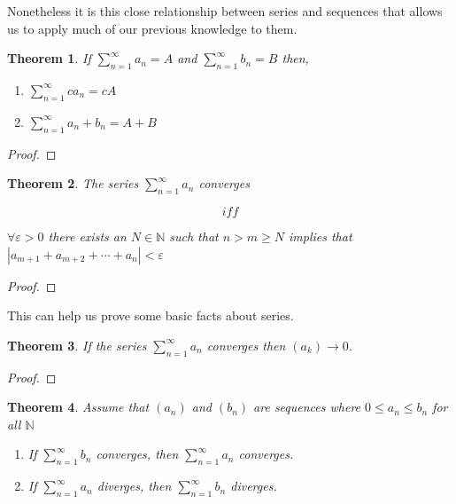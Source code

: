 \documentclass{tufte-book}
\newtheorem{theorem}{Theorem}[chapter]
\theoremstyle{definition}
\numberwithin{section}{chapter}
\begin{document}
		Nonetheless it is this close relationship between series and sequences that allows us to apply much of our previous knowledge to them.
		
		
		\begin{theorem}
		If $\sum_{n=1}^{\infty} a_n = A$ and $\sum_{n=1}^{\infty} b_n = B$ then,
			\begin{enumerate}[(1)]
				\item $\sum_{n=1}^{\infty} c a_n = cA$
				\item $\sum_{n=1}^{\infty} a_n + b_n = A + B$
			\end{enumerate}
		\end{theorem}
		
		\begin{proof}
		\end{proof}
		
		\begin{theorem} 
		The series $\sum_{n=1}^{\infty} a_n$ converges 
		
		$$iff$$
		
		
		 $\forall \varepsilon > 0$ there exists an $N \in \mathbb{N}$ such that $n>m\geq N$ implies that $|a_{m+1} + a_{m+2} + \cdots + a_n| < \varepsilon$
		\end{theorem}
		
		
	\begin{proof}  \end{proof}
	
	This can help us prove some basic facts about series.
	
	
	\begin{theorem} If the series $\sum_{n=1}^{\infty} a_n$ converges then $(a_k) \to 0$.  
	\end{theorem}
	
	\begin{proof}  \end{proof}
	
	\begin{theorem}  Assume that $(a_n)$ and $(b_n)$ are sequences where $0 \leq a_n \leq b_n$  for all $\mathbb{N}$
		\begin{enumerate}
			\item If $\sum_{n=1}^{\infty} b_n$ converges, then $\sum_{n=1}^{\infty} a_n$ converges.
			\item If $\sum_{n=1}^{\infty} a_n$ diverges, then $\sum_{n=1}^{\infty} b_n$ diverges.
		\end{enumerate}
	\end{theorem}
	
\end{document}
